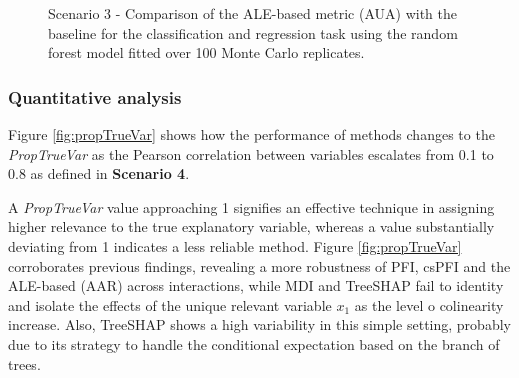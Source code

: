 \begin{figure}[ht!]
\centering
  \caption{Scenario 3 - Comparison of the ALE-based metric (AUA) with the baseline for the classification and regression task using the random forest model fitted over 100 Monte Carlo replicates.}
    \label{fig:scenario3}
\end{figure}

\subsubsection{Quantitative analysis}

Figure \ref{fig:propTrueVar} shows how the performance of methods changes to the \textit{PropTrueVar} as the Pearson correlation between variables escalates from 0.1 to 0.8 as defined in \textbf{Scenario 4}.

A \textit{PropTrueVar} value approaching 1 signifies an effective technique in assigning higher relevance to the true explanatory variable, whereas a value substantially deviating from 1 indicates a less reliable method. Figure \ref{fig:propTrueVar} corroborates previous findings, revealing a more robustness of \gls{PFI}, \gls{csPFI} and the ALE-based (\gls{AAR}) across interactions, while \gls{MDI} and TreeSHAP fail to identity and isolate the effects of the unique relevant variable \(x_1\) as the level o colinearity increase. Also, TreeSHAP shows a high variability in this simple setting, probably due to its strategy to handle the conditional expectation based on the branch of trees. 

